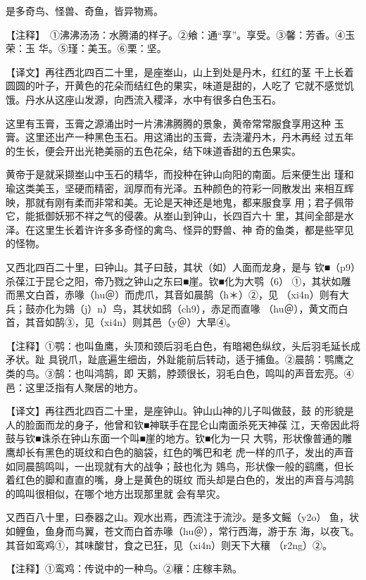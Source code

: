 \documentclass[a4paper,12pt,UTF8,twoside]{ctexbook}
\begin{document}
是多奇鸟、怪兽、奇鱼，皆异物焉。

【注释】　①沸沸汤汤：水腾涌的样子。②飨：通“享”。享受。③馨：芳香。④玉荣：玉 华。⑤瑾：美玉。⑥栗：坚。

【译文】再往西北四百二十里，是座峚山，山上到处是丹木，红红的茎 干上长着圆圆的叶子，开黄色的花朵而结红色的果实，味道是甜的，人吃了 它就不感觉饥饿。丹水从这座山发源，向西流入稷泽，水中有很多白色玉石。

这里有玉膏，玉膏之源涌出时一片沸沸腾腾的景象，黄帝常常服食享用这种 玉膏。这里还出产一种黑色玉石。用这涌出的玉膏，去浇灌丹木，丹木再经 过五年的生长，便会开出光艳美丽的五色花朵，结下味道香甜的五色果实。

黄帝于是就采撷峚山中玉石的精华，而投种在钟山向阳的南面。后来便生出 瑾和瑜这类美玉，坚硬而精密，润厚而有光泽。五种颜色的符彩一同散发出 来相互辉映，那就有刚有柔而非常和美。无论是天神还是地鬼，都来服食享 用；君子佩带它，能抵御妖邪不祥之气的侵袭。从峚山到钟山，长四百六十 里，其间全部是水泽。在这里生长着许许多多奇怪的禽鸟、怪异的野兽、神 奇的鱼类，都是些罕见的怪物。

又西北四百二十里，曰钟山。其子曰鼓，其状（如）人面而龙身，是与 钦■（p9）杀葆江于昆仑之阳，帝乃戮之钟山之东曰■崖。钦■化为大鹗（6） ①，其状如雕而黑文白首，赤喙（hu＠）而虎爪，其音如晨鹄（h＊）②，见 （xi4n）则有大兵；鼓亦化为鵕（j）n）鸟，其状如鸱（ch9），赤足而直喙 （hu＠），黄文而白首，其音如鹄③，见（xi4n）则其邑（y＠）大旱④。

【注释】①鹗：也叫鱼鹰，头顶和颈后羽毛白色，有暗褐色纵纹，头后羽毛延长成矛状。趾 具锐爪，趾底遍生细齿，外趾能前后转动，适于捕鱼。②晨鹄：鹗鹰之类的鸟。③鹄：也叫鸿鹄，即 天鹅，脖颈很长，羽毛白色，鸣叫的声音宏亮。④邑：这里泛指有人聚居的地方。

【译文】再往西北四百二十里，是座钟山。钟山山神的儿子叫做鼓，鼓 的形貌是人的脸面而龙的身子，他曾和钦■神联手在昆仑山南面杀死天神葆 江，天帝因此将鼓与钦■诛杀在钟山东面一个叫■崖的地方。钦■化为一只 大鹗，形状像普通的雕鹰却长有黑色的斑纹和白色的脑袋，红色的嘴巴和老 虎一样的爪子，发出的声音如同晨鹄鸣叫，一出现就有大的战争；鼓也化为 鵕鸟，形状像一般的鹞鹰，但长着红色的脚和直直的嘴，身上是黄色的斑纹 而头却是白色的，发出的声音与鸿鹄的鸣叫很相似，在哪个地方出现那里就 会有旱灾。

又西百八十里，曰泰器之山。观水出焉，西流注于流沙。是多文鳐（y2o） 鱼，状如鲤鱼，鱼身而鸟翼，苍文而白首赤喙（hu＠），常行西海，游于东 海，以夜飞。其音如鸾鸡①，其味酸甘，食之已狂，见（xi4n）则天下大穰 （r2ng）②。

【注释】①鸾鸡：传说中的一种鸟。②穰：庄稼丰熟。
\end{document}

